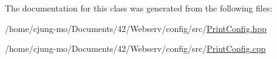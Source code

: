 The documentation for this class was generated from the following files\+:\begin{DoxyCompactItemize}
\item 
/home/cjung-\/mo/\+Documents/42/\+Webserv/config/src/\hyperlink{_print_config_8hpp}{Print\+Config.\+hpp}\item 
/home/cjung-\/mo/\+Documents/42/\+Webserv/config/src/\hyperlink{_print_config_8cpp}{Print\+Config.\+cpp}\end{DoxyCompactItemize}
